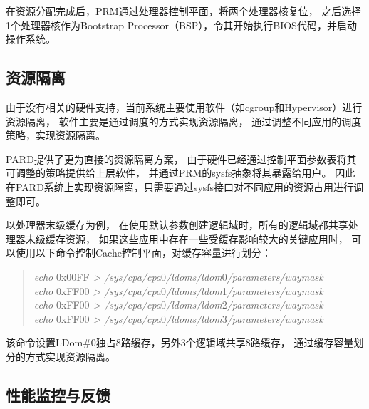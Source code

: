 在资源分配完成后，PRM通过处理器控制平面，将两个处理器核复位，
之后选择1个处理器核作为Bootstrap Processor（BSP），令其开始执行BIOS代码，并启动操作系统。

%


\subsection{资源隔离}

由于没有相关的硬件支持，当前系统主要使用软件（如cgroup和Hypervisor）进行资源隔离，
软件主要是通过调度的方式实现资源隔离，
通过调整不同应用的调度策略，实现资源隔离。

PARD提供了更为直接的资源隔离方案，
由于硬件已经通过控制平面参数表将其可调整的策略提供给上层软件，
并通过PRM的sysfs抽象将其暴露给用户。
因此在PARD系统上实现资源隔离，只需要通过sysfs接口对不同应用的资源占用进行调整即可。

以处理器末级缓存为例，
在使用默认参数创建逻辑域时，所有的逻辑域都共享处理器末级缓存资源，
如果这些应用中存在一些受缓存影响较大的关键应用时，
可以使用以下命令控制Cache控制平面，对缓存容量进行划分：

\begin{verse}
\textit{echo} 0x00FF \textit{>  /sys/cpa/cpa}0\textit{/ldoms/ldom}0\textit{/parameters/waymask} \\
\textit{echo} 0xFF00 \textit{>  /sys/cpa/cpa}0\textit{/ldoms/ldom}1\textit{/parameters/waymask} \\
\textit{echo} 0xFF00 \textit{>  /sys/cpa/cpa}0\textit{/ldoms/ldom}2\textit{/parameters/waymask} \\
\textit{echo} 0xFF00 \textit{>  /sys/cpa/cpa}0\textit{/ldoms/ldom}3\textit{/parameters/waymask} \\
\end{verse}

该命令设置LDom\#0独占8路缓存，另外3个逻辑域共享8路缓存，
通过缓存容量划分的方式实现资源隔离。


\subsection{性能监控与反馈}

